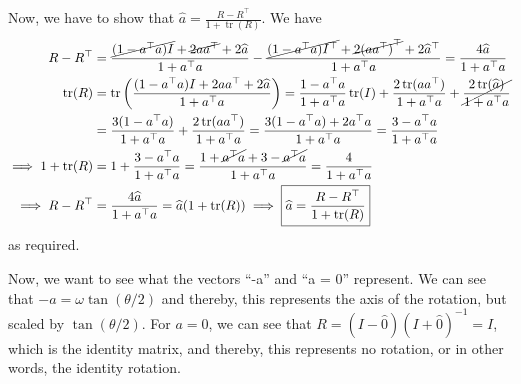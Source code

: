 Now, we have to show that \( \displaystyle \widehat{a} = \frac{R - R^{\top}}{1 + \operatorname{tr}(R)} \).
We have
\begin{align*}
    R - R^\top
     & =
    \frac{\cancel{(1 - a^{\top} a) I} + \cancel{2 a a^{\top}} + 2 \widehat{a}}{1 + a^{\top} a} - \frac{\cancel{(1 - a^{\top} a) I^\top} + \cancel{2 {(a a^{\top})}^\top} + 2 \widehat{a}^\top}{1 + a^{\top} a}
    =
    \frac{4 \widehat{a}}{1 + a^{\top} a}
    \\
    \operatorname{tr}(R)
     & =
    \operatorname{tr}\left( \frac{(1 - a^{\top} a) I + 2 a a^{\top} + 2 \widehat{a}}{1 + a^{\top} a} \right)
    =
    \frac{1 - a^{\top} a}{1 + a^{\top} a} \operatorname{tr}(I) + \frac{2 \operatorname{tr}(a a^{\top})}{1 + a^{\top} a} + \cancel{\frac{2 \operatorname{tr}(\widehat{a})}{1 + a^{\top} a}}
    \\ & =
    \frac{3 (1 - a^{\top} a)}{1 + a^{\top} a} + \frac{2 \operatorname{tr}(a a^{\top})}{1 + a^{\top} a}
    =
    \frac{3 (1 - a^{\top} a) + 2 a^{\top} a}{1 + a^{\top} a}
    =
    \frac{3 - a^{\top} a}{1 + a^{\top} a}
    \\
    \implies
    1 + \operatorname{tr}(R)
     & =
    1 + \frac{3 - a^{\top} a}{1 + a^{\top} a}
    =
    \frac{1 + \cancel{a^{\top} a} + 3 - \cancel{a^{\top} a}}{1 + a^{\top} a}
    =
    \frac{4}{1 + a^{\top} a}
    \\
    \implies
    R - R^\top
     & =
    \frac{4 \widehat{a}}{1 + a^{\top} a}
    =
    \widehat{a} (1 + \operatorname{tr}(R))
    \implies
    \boxed{
        \widehat{a}
        =
        \frac{R - R^\top}{1 + \operatorname{tr}(R)}
    }
\end{align*}
as required.

Now, we want to see what the vectors ``-a'' and ``a = 0'' represent.
We can see that \( -a = \omega \tan(\theta / 2) \) and thereby, this represents the axis of the rotation, but scaled by \( \tan(\theta / 2) \).
For \( a = 0 \), we can see that \( R = (I - \widehat{0}) {(I + \widehat{0})}^{-1} = I \), which is the identity matrix, and thereby, this represents no rotation, or in other words, the identity rotation.
